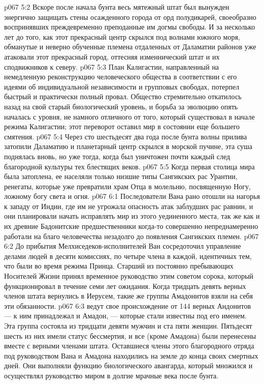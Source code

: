 \vs p067 5:2 Вскоре после начала бунта весь мятежный штат был вынужден энергично защищать стены осажденного города от орд полудикарей, своеобразно воспринявших преждевременно преподанные им догмы свободы. И за несколько лет до того, как этот прекрасный центр скрылся под волнами южного моря, обманутые и неверно обученные племена отдаленных от Даламатии районов уже атаковали этот прекрасный город, оттесняя изменнический штат и их сподвижников к северу.
\vs p067 5:3 План Калигастии, направленный на немедленную реконструкцию человеческого общества в соответствии с его идеями об индивидуальной независимости и групповых свободах, потерпел быстрый и практически полный провал. Общество стремительно откатилось назад на свой старый биологический уровень, и борьба за эволюцию опять началась с уровня, не намного отличного от того, который существовал в начале режима Калигастии; этот переворот оставил мир в состоянии еще большего смятения.
\vs p067 5:4 \pc Через сто шестьдесят два года после бунта волны прилива затопили Даламатию и планетарный центр скрылся в морской пучине, эта суша поднялась вновь, но уже тогда, когда был уничтожен почти каждый след благородной культуры тех блестящих веков.
\vs p067 5:5 Когда первая столица мира была затоплена, ее населяли только низшие типы Сангикских рас Урантии, ренегаты, которые уже превратили храм Отца в молельню, посвященную Ногу, ложному богу света и огня.
\vs p067 6:1 Последователи Вана рано отошли на нагорья к западу от Индии, где им не угрожала опасность атак заблудших рас равнин, и они планировали начать исправлять мир из этого уединенного места, так же как и их древние Бадонитские предшественники когда\hyp{}то совершенно непреднамеренно работали на благо человечества незадолго до появления Сангикских племен.
\vs p067 6:2 До прибытия Мелхиседеков\hyp{}исполнителей Ван сосредоточил управление делами людей в десяти комиссиях, по четыре члена в каждой, идентичных тем, что были во время режима Принца. Старший из постоянно пребывающих Носителей Жизни принял временное руководство этим советом сорока, который функционировал в течение семи лет ожидания. Когда тридцать девять верных членов штата вернулись в Иерусем, такие же группы Амадонитов взяли на себя эти обязанности.
\vs p067 6:3  ведут свое происхождение от 144 верных Андонитов --- к ним принадлежал и Амадон, --- которые стали известны под его именем. Эта группа состояла из тридцати девяти мужчин и ста пяти женщин. Пятьдесят шесть из них имели статус бессмертия, и все (кроме Амадона) были перенесены вместе с верными членами штата. Оставшиеся члены этого благородного отряда под руководством Вана и Амадона находились на земле до конца своих смертных дней. Они выполняли функцию биологического авангарда, который множился и осуществлял руководство миром в долгие мрачные века после бунта.
